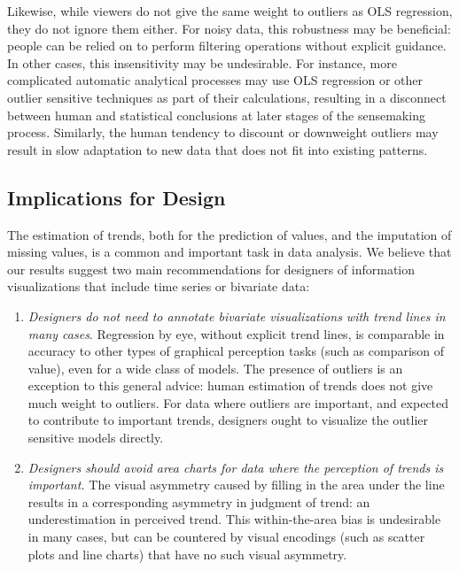 \documentclass{sigchi}
\begin{document}
Likewise, while viewers do not give the same weight to outliers as OLS regression, they do not ignore them either. For noisy data, this robustness may be beneficial: people can be relied on to perform filtering operations without explicit guidance. In other cases, this insensitivity may be undesirable. For instance, more complicated automatic analytical processes may use OLS regression or other outlier sensitive techniques as part of their calculations, resulting in a disconnect between human and statistical conclusions at later stages of the sensemaking process. Similarly, the human tendency to discount or downweight outliers may result in slow adaptation to new data that does not fit into existing patterns.

\subsection{Implications for Design}

The estimation of trends, both for the prediction of values, and the imputation of missing values, is a common and important task in data analysis. We believe that our results suggest two main recommendations for designers of information visualizations that include time series or bivariate data:

\begin{enumerate}
	\item \emph{Designers do not need to annotate bivariate visualizations with trend lines in many cases}. Regression by eye, without explicit trend lines, is comparable in accuracy to other types of graphical perception tasks (such as comparison of value), even for a wide class of models. The presence of outliers is an exception to this general advice: human estimation of trends does not give much weight to outliers. For data where outliers are important, and expected to contribute to important trends, designers ought to visualize the outlier sensitive models directly.
	
	\item \emph{Designers should avoid area charts for data where the perception of trends is important.} The visual asymmetry caused by filling in the area under the line results in a corresponding asymmetry in judgment of trend: an underestimation in perceived trend. This within-the-area bias is undesirable in many cases, but can be countered by visual encodings (such as scatter plots and line charts) that have no such visual asymmetry.
\end{enumerate}
\end{document}
